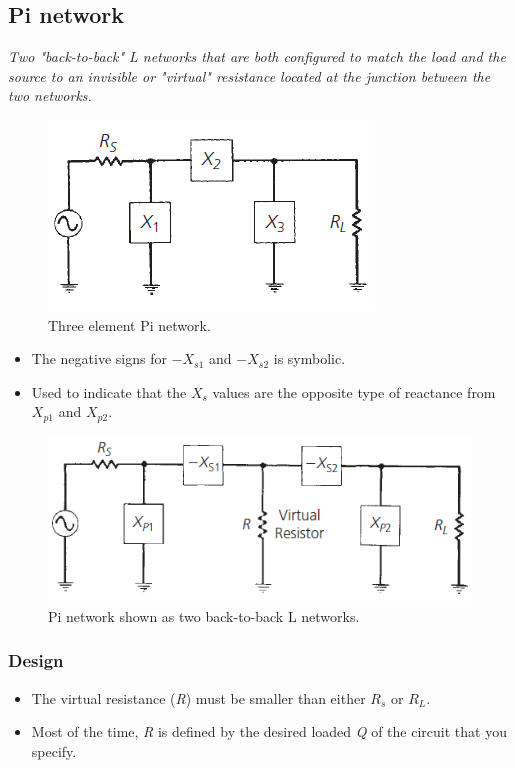 \subsection{Pi network}
\textit{Two "back-to-back" L networks that are both configured to match the load and
	the source to an invisible or "virtual" resistance located at the junction between the two networks.}

\begin{figure} [H]
	\centering
	\includegraphics[width=0.6\linewidth]{graphics/27.png}
	\caption{Three element Pi network.}
	\label{fig:27}
\end{figure}

\begin{itemize}
	\item The negative signs for $-X_{s1}$ and $-X_{s2}$ is symbolic.
	\item Used to indicate that the $X_s$ values are the opposite type of reactance from $X_{p1}$ and $X_{p2}$.
\end{itemize}

\begin{figure} [H]
	\centering
	\includegraphics[width=0.8\linewidth]{graphics/29.png}
	\caption{Pi network shown as two back-to-back L networks.}
	\label{fig:29}
\end{figure}

\subsubsection{Design}
\begin{itemize}
	\item The virtual resistance (\textit{R}) must be smaller than either $R_s$ or $R_L$.
	\item Most of the time, \textit{R} is defined by the desired loaded \textit{Q} of the
	circuit that you specify.
\end{itemize}

